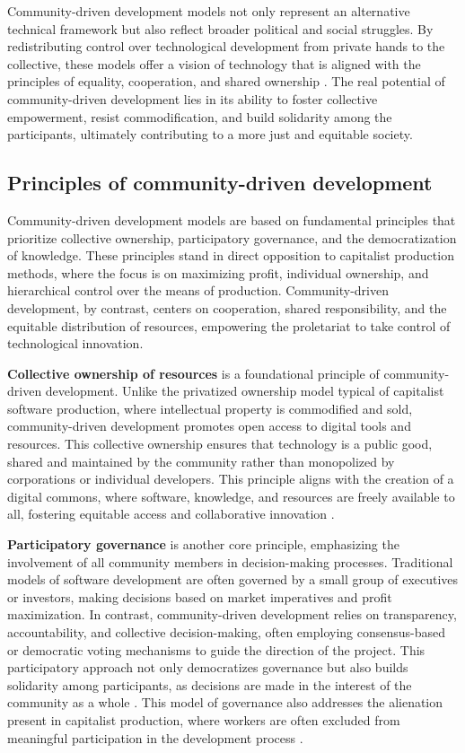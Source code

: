 \begin{refsection}
Community-driven development models not only represent an alternative technical framework but also reflect broader political and social struggles. By redistributing control over technological development from private hands to the collective, these models offer a vision of technology that is aligned with the principles of equality, cooperation, and shared ownership \cite[pp.~712-715]{marx1993}. The real potential of community-driven development lies in its ability to foster collective empowerment, resist commodification, and build solidarity among the participants, ultimately contributing to a more just and equitable society.

\subsection{Principles of community-driven development}

Community-driven development models are based on fundamental principles that prioritize collective ownership, participatory governance, and the democratization of knowledge. These principles stand in direct opposition to capitalist production methods, where the focus is on maximizing profit, individual ownership, and hierarchical control over the means of production. Community-driven development, by contrast, centers on cooperation, shared responsibility, and the equitable distribution of resources, empowering the proletariat to take control of technological innovation.

\textbf{Collective ownership of resources} is a foundational principle of community-driven development. Unlike the privatized ownership model typical of capitalist software production, where intellectual property is commodified and sold, community-driven development promotes open access to digital tools and resources. This collective ownership ensures that technology is a public good, shared and maintained by the community rather than monopolized by corporations or individual developers. This principle aligns with the creation of a digital commons, where software, knowledge, and resources are freely available to all, fostering equitable access and collaborative innovation \cite[pp.~64-66]{foster2000}.

\textbf{Participatory governance} is another core principle, emphasizing the involvement of all community members in decision-making processes. Traditional models of software development are often governed by a small group of executives or investors, making decisions based on market imperatives and profit maximization. In contrast, community-driven development relies on transparency, accountability, and collective decision-making, often employing consensus-based or democratic voting mechanisms to guide the direction of the project. This participatory approach not only democratizes governance but also builds solidarity among participants, as decisions are made in the interest of the community as a whole \cite[pp.~83-85]{kelty2008}. This model of governance also addresses the alienation present in capitalist production, where workers are often excluded from meaningful participation in the development process \cite[pp.~71-73]{marx1993}.


\end{refsection}
